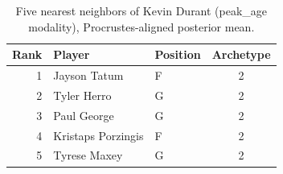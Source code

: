 \begin{table}[htbp]
  \centering\small
  \begin{tabular}{rllc}
    \toprule
    Rank & Player & Position & Archetype \\
    \midrule
    1 & Jayson Tatum & F & 2 \\
    2 & Tyler Herro & G & 2 \\
    3 & Paul George & G & 2 \\
    4 & Kristaps Porzingis & F & 2 \\
    5 & Tyrese Maxey & G & 2 \\
    \bottomrule
  \end{tabular}
  \caption{Five nearest neighbors of Kevin Durant (peak_age modality), Procrustes-aligned posterior mean.}
  \label{tab:Kevin_Durant_neighbors_peak_age}
\end{table}


